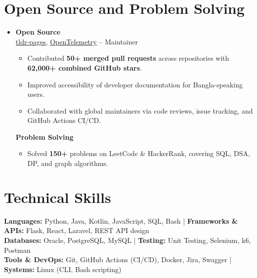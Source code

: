 \documentclass[a4paper]{article}
\newcommand{\subheading}[1]{\noindent \textbf{#1} \\}
\begin{document}
\section{Open Source and Problem Solving}
\begin{itemize}[leftmargin=0.15in, label={}, parsep=0pt]
\item
\small
\subheading{Open Source}
\href{https://github.com/tldr-pages/tldr}{tldr-pages}, \href{https://github.com/open-telemetry}{OpenTelemetry} --
Maintainer
\begin{itemize}[noitemsep, topsep=0pt]
    \item Contributed \textbf{50+ merged pull requests} across repositories with \textbf{62,000+ combined GitHub stars}.
    \item Improved accessibility of developer documentation for Bangla-speaking users.
    \item Collaborated with global maintainers via code reviews, issue tracking, and GitHub Actions CI/CD.
\end{itemize}

\vspace{0.5em}

\subheading{Problem Solving}
\begin{itemize}[noitemsep, topsep=0pt, partopsep=0pt]
\item Solved \textbf{150+} problems on LeetCode \& HackerRank, covering SQL, DSA, DP, and graph algorithms.
\end{itemize}
\end{itemize}




\section{Technical Skills}
\begin{itemize}[leftmargin=0.15in, label={}]
\small{\item{
\textbf{Languages:} Python, Java, Kotlin, JavaScript, SQL, Bash \;|\;
\textbf{Frameworks \& APIs:} Flask, React, Laravel, REST API design\\
\textbf{Databases:} Oracle, PostgreSQL, MySQL \;|\;
\textbf{Testing:} Unit Testing, Selenium, k6, Postman\\
\textbf{Tools \& DevOps:} Git, GitHub Actions (CI/CD), Docker, Jira, Swagger \;|\;
\textbf{Systems:} Linux (CLI, Bash scripting)
}}
\end{itemize}
\end{document}
